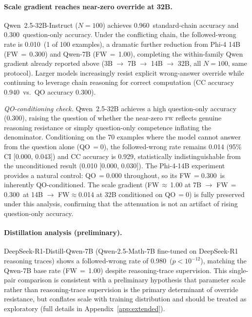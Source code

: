 \documentclass{article}
\theoremstyle{definition}
\theoremstyle{definition}
\newcommand{\SBCCFW}{1.00}
\newcommand{\PHIFOURCCFW}{0.300}
\newcommand{\QWTBSCACC}{0.960}
\newcommand{\QWTBCCACC}{0.940}
\newcommand{\QWTBCCFW}{0.010}
\newcommand{\QWTBQOACC}{0.300}
\newcommand{\QWTBN}{100}
\newcommand{\DSFW}{0.980}
\newcommand{\DSPVAL}{$p{<}10^{-12}$}
\begin{document}
\paragraph{Scale gradient reaches near-zero override at 32B.}
Qwen~2.5-32B-Instruct ($N{=}\QWTBN$) achieves \QWTBSCACC\ standard-chain
accuracy and \QWTBQOACC\ question-only accuracy.
Under the conflicting chain, the followed-wrong rate is \QWTBCCFW\
(1 of \QWTBN{} examples), a dramatic further reduction from Phi-4 14B
(FW\,$=$\,\PHIFOURCCFW) and Qwen-7B (FW\,$=$\,\SBCCFW),
completing the within-family Qwen gradient already reported above
(3B $\to$ 7B $\to$ 14B $\to$ 32B, all $N{=}100$, same protocol).
Larger models increasingly resist explicit wrong-answer override while
continuing to leverage chain reasoning for correct computation
(CC accuracy \QWTBCCACC\ vs.\ QO accuracy \QWTBQOACC).

\emph{QO-conditioning check.}
Qwen~2.5-32B achieves a high question-only accuracy (\QWTBQOACC),
raising the question of whether the near-zero \textsc{fw} reflects genuine
reasoning resistance or simply question-only competence inflating the denominator.
Conditioning on the 70 examples where the model cannot answer from the question
alone (QO$\,=$0), the followed-wrong rate remains 0.014 (95\% CI [0.000, 0.043])
and CC accuracy is 0.929, statistically indistinguishable from the unconditioned
result (\QWTBCCFW{} [0.000, 0.030]).
The Phi-4-14B experiment provides a natural control: QO$\,=$0.000 throughout,
so its FW$\,=$\PHIFOURCCFW\ is inherently QO-conditioned.
The scale gradient (FW\,$\approx$\,1.00 at 7B $\to$ FW\,$=$\,\PHIFOURCCFW\ at
14B $\to$ FW$\approx$0.014 at 32B conditioned on QO$\,=$0) is fully preserved
under this analysis, confirming that the attenuation is not an artifact of
rising question-only accuracy.
\paragraph{Distillation analysis (preliminary).}
DeepSeek-R1-Distill-Qwen-7B (Qwen-2.5-Math-7B fine-tuned on DeepSeek-R1 reasoning
traces) shows a followed-wrong rate of \DSFW\ (\DSPVAL), matching the Qwen-7B base
rate (FW\,$=$\,\SBCCFW) despite reasoning-trace supervision. This single-pair comparison
is consistent with a preliminary hypothesis that parameter scale rather than
reasoning-trace supervision is the primary determinant of override resistance, but
conflates scale with training distribution and should be treated as exploratory
(full details in Appendix~\ref{app:extended}).
\end{document}
